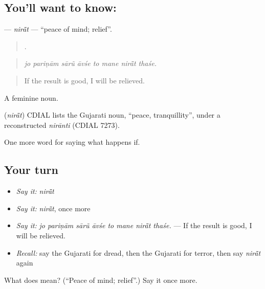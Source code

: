 \subsection*{You'll want to know: }
\textbf{} — \emph{nirā̃t} — \textquotedblleft{}peace of mind; relief\textquotedblright{}.

\begin{quote}
       .
\end{quote}

\begin{quote}
\emph{jo pariṇām sārũ āvśe to mane nirā̃t thaśe.}
\end{quote}

\begin{quote}
If the result is good, I will be relieved.
\end{quote}

A feminine noun.

\begin{cousinweb}
\textbf{} (\emph{nirā̃t}) CDIAL lists the Gujarati noun, \textquotedblleft{}peace, tranquillity\textquotedblright{}, under a reconstructed \emph{nirānti} (CDIAL 7273).
\end{cousinweb}

\begin{grammarlens}[title={What you've built}]
One more word for saying what happens if.
\end{grammarlens}

\subsection*{Your turn}
\begin{itemize}
\raggedright
  \item \emph{Say it:} \emph{nirā̃t}
  \item \emph{Say it:} \emph{nirā̃t}, once more
  \item \emph{Say it:} \emph{jo pariṇām sārũ āvśe to mane nirā̃t thaśe.} — If the result is good, I will be relieved.
  \item \emph{Recall:} say the Gujarati for dread, then the Gujarati for terror, then say \emph{nirā̃t} again
\end{itemize}

\begin{tcolorbox}[breakable,colback=teal!4,colframe=teal!35!black,title={Before you move on}]
What does  mean? (\textquotedblleft{}Peace of mind; relief\textquotedblright{}.) Say it once more.
\end{tcolorbox}
